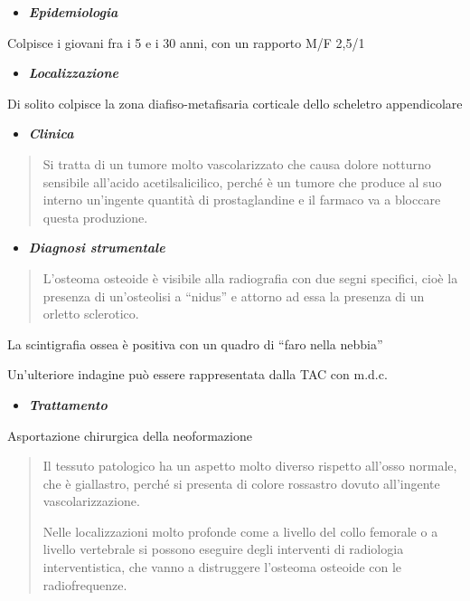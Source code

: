 \documentclass[]{article}
\begin{document}
\begin{itemize}
\item
  \textbf{\emph{Epidemiologia}}
\end{itemize}

Colpisce i giovani fra i 5 e i 30 anni, con un rapporto M/F 2,5/1

\begin{itemize}
\item
  \textbf{\emph{Localizzazione}}
\end{itemize}

Di solito colpisce la zona diafiso-metafisaria corticale dello scheletro
appendicolare

\begin{itemize}
\item
  \textbf{\emph{Clinica}}
\end{itemize}

\begin{quote}
Si tratta di un tumore molto vascolarizzato che causa dolore notturno
sensibile all'acido acetilsalicilico, perché è un tumore che produce al
suo interno un'ingente quantità di prostaglandine e il farmaco va a
bloccare questa produzione.
\end{quote}

\begin{itemize}
\item
  \textbf{\emph{Diagnosi strumentale}}
\end{itemize}

\begin{quote}
L'osteoma osteoide è visibile alla radiografia con due segni specifici,
cioè la presenza di un'osteolisi a ``nidus'' e attorno ad essa la
presenza di un orletto sclerotico.
\end{quote}

La scintigrafia ossea è positiva con un quadro di ``faro nella nebbia''

Un'ulteriore indagine può essere rappresentata dalla TAC con m.d.c.

\begin{itemize}
\item
  \textbf{\emph{Trattamento}}
\end{itemize}

Asportazione chirurgica della neoformazione

\begin{quote}
Il tessuto patologico ha un aspetto molto diverso rispetto all'osso
normale, che è giallastro, perché si presenta di colore rossastro dovuto
all'ingente vascolarizzazione.

Nelle localizzazioni molto profonde come a livello del collo femorale o
a livello vertebrale si possono eseguire degli interventi di radiologia
interventistica, che vanno a distruggere l'osteoma osteoide con le
radiofrequenze.
\end{quote}
\end{document}
